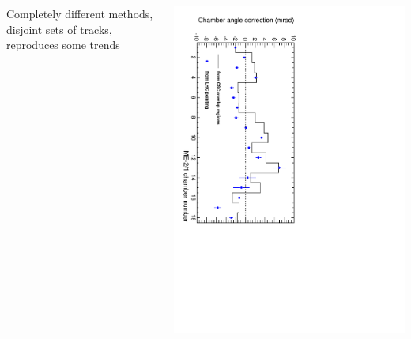 \documentclass[compress]{beamer}
\begin{document}
\begin{frame}
\begin{columns}
\begin{center}
\vspace{0.3 cm}
\scriptsize Completely different methods, disjoint sets of tracks, reproduces some trends

\end{center}
\begin{center}
\includegraphics[height=\linewidth, angle=90]{angle_comparison_meminus21.pdf}
\end{center}
\end{columns}
\end{frame}
\end{document}
